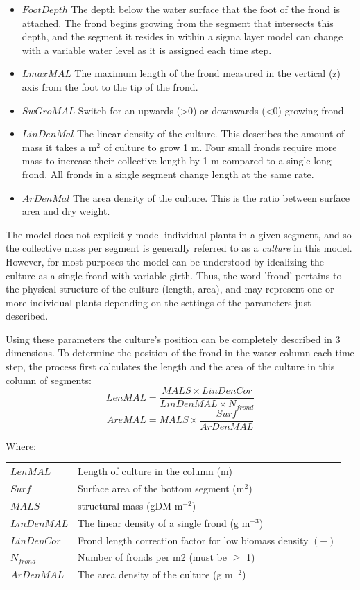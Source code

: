 \documentclass{deltares_manual}
\begin{document}
\begin{itemize}
\item $FootDepth$ The depth below the water surface that the foot of the frond is attached. The frond begins growing from the segment that intersects this depth, and the segment it resides in within a sigma layer model can change with a variable water level as it is assigned each time step.
\item $LmaxMAL$ The maximum length of the frond measured in the vertical (z) axis from the foot to the tip of the frond.
\item $SwGroMAL$ Switch for an upwards (\textgreater 0) or downwards (\textless 0) growing frond.
\item $LinDenMal$ The linear density of the culture. This describes the amount of mass it takes a m$^{2}$ of culture to grow 1 m. Four small fronds require more mass to increase their collective length by 1 m compared to a single long frond. All fronds in a single segment change length at the same rate.
\item $ArDenMal$ The area density of the culture. This is the ratio between surface area and dry weight.
\end{itemize}
The model does not explicitly model individual plants in a given segment, and so the collective mass per segment is generally referred to as a \textit{culture} in this model. However, for most purposes the model can be understood by idealizing the culture as a single frond with variable girth. Thus, the word 'frond' pertains to the physical structure of the culture (length, area), and may represent one or more individual plants depending on the settings of the parameters just described. 

Using these parameters the culture's position can be completely described in 3 dimensions. To determine the position of the frond in the water column each time step, the process first calculates the length and the area of the culture in this column of segments:
\begin{equation}
	LenMAL = \frac{MALS \times LinDenCor}{LinDenMAL \times N_{frond}}
\end{equation}
\begin{equation}
	AreMAL = MALS \times \frac{Surf}{ArDenMAL}
\end{equation}


Where:\\

\begin{tabular}{ll}
$LenMAL$ & Length of culture in the column (m)\\
$Surf$ & Surface area of the bottom segment (m$^{2}$)\\
$MALS$ & structural mass (gDM m$^{-2}$)\\
$LinDenMAL$ & The linear density of a single frond (g m$^{-3}$)\\
$LinDenCor$ & Frond length correction factor for low biomass density $(-)$\\
$N_{frond}$ & Number of fronds per m2 (must be $\ge$ 1)\\
$ArDenMAL$ & The area density of the culture (g m$^{-2}$)\\
\end{tabular}
\end{document}
